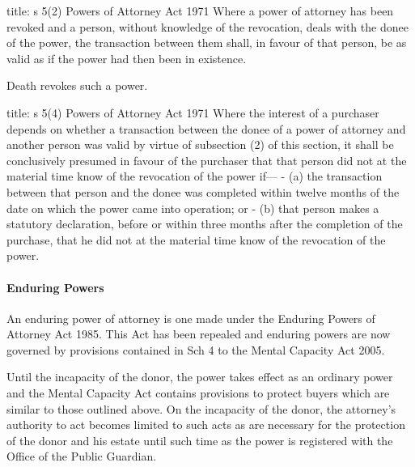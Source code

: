 \documentclass[
]{article}
\newenvironment{Shaded}{}{}
\newcommand{\NormalTok}[1]{#1}
\begin{document}
\begin{Shaded}
\begin{Highlighting}[]
\NormalTok{title: s 5(2) Powers of Attorney Act 1971}
\NormalTok{Where a power of attorney has been revoked and a person, without knowledge of the revocation, deals with the donee of the power, the transaction between them shall, in favour of that person, be as valid as if the power had then been in existence.}
\end{Highlighting}
\end{Shaded}

Death revokes such a power.

\begin{Shaded}
\begin{Highlighting}[]
\NormalTok{title: s 5(4) Powers of Attorney Act 1971}
\NormalTok{Where the interest of a purchaser depends on whether a transaction between the donee of a power of attorney and another person was valid by virtue of subsection (2) of this section, it shall be conclusively presumed in favour of the purchaser that that person did not at the material time know of the revocation of the power if—}
\NormalTok{{-} (a) the transaction between that person and the donee was completed within twelve months of the date on which the power came into operation; or}
\NormalTok{{-} (b) that person makes a statutory declaration, before or within three months after the completion of the purchase, that he did not at the material time know of the revocation of the power.}
\end{Highlighting}
\end{Shaded}

\hypertarget{enduring-powers}{%
\paragraph{Enduring Powers}\label{enduring-powers}}

\begin{Shaded}
\begin{Highlighting}[]
\NormalTok{An enduring power of attorney is one made under the Enduring Powers of Attorney Act 1985. This Act has been repealed and enduring powers are now governed by provisions contained in Sch 4 to the Mental Capacity Act 2005. }
\end{Highlighting}
\end{Shaded}

Until the incapacity of the donor, the power takes effect as an ordinary
power and the Mental Capacity Act contains provisions to protect buyers
which are similar to those outlined above. On the incapacity of the
donor, the attorney's authority to act becomes limited to such acts as
are necessary for the protection of the donor and his estate until such
time as the power is registered with the Office of the Public Guardian.
\end{document}

